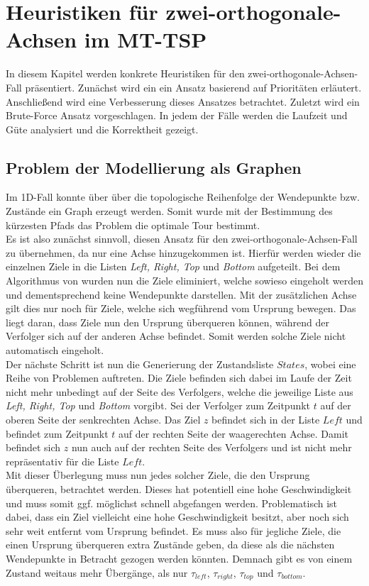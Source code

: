 \documentclass[german,version-2019-11]{uzl-thesis}
\begin{document}
\chapter{Heuristiken für zwei-orthogonale-Achsen im MT-TSP}

In diesem Kapitel werden konkrete Heuristiken für den zwei-orthogonale-Achsen-Fall präsentiert. Zunächst wird ein ein Ansatz basierend auf Prioritäten erläutert. Anschließend wird eine Verbesserung dieses Ansatzes betrachtet. Zuletzt wird ein Brute-Force Ansatz vorgeschlagen. In jedem der Fälle werden die Laufzeit und Güte analysiert und die Korrektheit gezeigt.

\section{Problem der Modellierung als Graphen}
Im 1D-Fall konnte über über die topologische Reihenfolge der Wendepunkte bzw. Zustände ein Graph erzeugt werden. Somit wurde mit der Bestimmung des kürzesten Pfads das Problem die optimale Tour bestimmt. \\
Es ist also zunächst sinnvoll, diesen Ansatz für den zwei-orthogonale-Achsen-Fall zu übernehmen, da nur eine Achse hinzugekommen ist. Hierfür werden wieder die einzelnen Ziele in die Listen \emph{Left, Right, Top} und \emph{Bottom} aufgeteilt. Bei dem Algorithmus von \cite{helvig} wurden nun die Ziele eliminiert, welche sowieso eingeholt werden und dementsprechend keine Wendepunkte darstellen. Mit der zusätzlichen Achse gilt dies nur noch für Ziele, welche sich wegführend vom Ursprung bewegen. Das liegt daran, dass Ziele nun den Ursprung überqueren können, während der Verfolger sich auf der anderen Achse befindet. Somit werden solche Ziele nicht automatisch eingeholt. \\
Der nächste Schritt ist nun die Generierung der Zustandsliste $States$, wobei eine Reihe von Problemen auftreten. Die Ziele befinden sich dabei im Laufe der Zeit nicht mehr unbedingt auf der Seite des Verfolgers, welche die jeweilige Liste aus \emph{Left, Right, Top} und \emph{Bottom} vorgibt. Sei der Verfolger zum Zeitpunkt $t$ auf der oberen Seite der senkrechten Achse. Das Ziel $z$ befindet sich in der Liste $Left$ und befindet zum Zeitpunkt $t$ auf der rechten Seite der waagerechten Achse. Damit befindet sich $z$ nun auch auf der rechten Seite des Verfolgers und ist nicht mehr repräsentativ für die Liste $Left$. \\
Mit dieser Überlegung muss nun jedes solcher Ziele, die den Ursprung überqueren, betrachtet werden. Dieses hat potentiell eine hohe Geschwindigkeit und muss somit ggf. möglichst schnell abgefangen werden. Problematisch ist dabei, dass ein Ziel vielleicht eine hohe Geschwindigkeit besitzt, aber noch sich sehr weit entfernt vom Ursprung befindet. Es muss also für jegliche Ziele, die einen Ursprung überqueren extra Zustände geben, da diese als die nächsten Wendepunkte in Betracht gezogen werden könnten. Demnach gibt es von einem Zustand weitaus mehr Übergänge, als nur $\tau_{left}$, $\tau_{right}$, $\tau_{top}$ und $\tau_{bottom}$. \\
\end{document}
